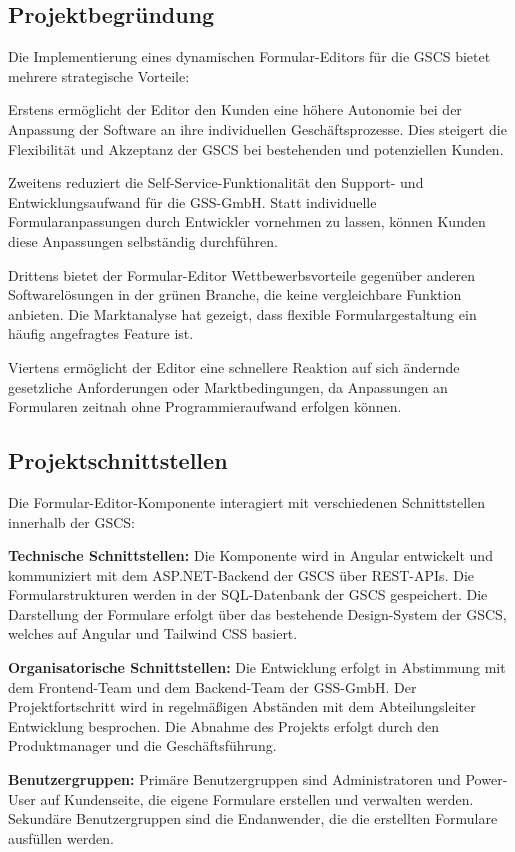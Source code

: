 \documentclass[a4paper,11pt]{article}
\begin{document}
\subsection{Projektbegründung}
Die Implementierung eines dynamischen Formular-Editors für die GSCS bietet mehrere strategische Vorteile:

Erstens ermöglicht der Editor den Kunden eine höhere Autonomie bei der Anpassung der Software an ihre individuellen Geschäftsprozesse. Dies steigert die Flexibilität und Akzeptanz der GSCS bei bestehenden und potenziellen Kunden.

Zweitens reduziert die Self-Service-Funktionalität den Support- und Entwicklungsaufwand für die GSS-GmbH. Statt individuelle Formularanpassungen durch Entwickler vornehmen zu lassen, können Kunden diese Anpassungen selbständig durchführen.

Drittens bietet der Formular-Editor Wettbewerbsvorteile gegenüber anderen Softwarelösungen in der grünen Branche, die keine vergleichbare Funktion anbieten. Die Marktanalyse hat gezeigt, dass flexible Formulargestaltung ein häufig angefragtes Feature ist.

Viertens ermöglicht der Editor eine schnellere Reaktion auf sich ändernde gesetzliche Anforderungen oder Marktbedingungen, da Anpassungen an Formularen zeitnah ohne Programmieraufwand erfolgen können.

\subsection{Projektschnittstellen}
Die Formular-Editor-Komponente interagiert mit verschiedenen Schnittstellen innerhalb der GSCS:

\textbf{Technische Schnittstellen:} Die Komponente wird in Angular entwickelt und kommuniziert mit dem ASP.NET-Backend der GSCS über REST-APIs. Die Formularstrukturen werden in der SQL-Datenbank der GSCS gespeichert. Die Darstellung der Formulare erfolgt über das bestehende Design-System der GSCS, welches auf Angular und Tailwind CSS basiert.

\textbf{Organisatorische Schnittstellen:} Die Entwicklung erfolgt in Abstimmung mit dem Frontend-Team und dem Backend-Team der GSS-GmbH. Der Projektfortschritt wird in regelmäßigen Abständen mit dem Abteilungsleiter Entwicklung besprochen. Die Abnahme des Projekts erfolgt durch den Produktmanager und die Geschäftsführung.

\textbf{Benutzergruppen:} Primäre Benutzergruppen sind Administratoren und Power-User auf Kundenseite, die eigene Formulare erstellen und verwalten werden. Sekundäre Benutzergruppen sind die Endanwender, die die erstellten Formulare ausfüllen werden.
\end{document}
